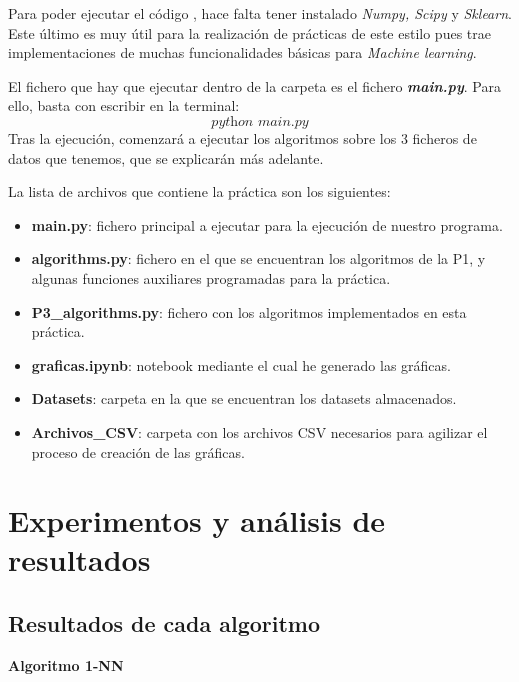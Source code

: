 \documentclass[10pt, a4paper]{article}
\theoremstyle{theorem-style}
\theoremstyle{theorem-style}
\theoremstyle{theorem2-style}
\theoremstyle{definition-style}
\theoremstyle{remark-style}
\theoremstyle{example-style}
\theoremstyle{definition-style}
\theoremstyle{remark-style}
\theoremstyle{remark-style}
\begin{document}
Para poder ejecutar el código , hace falta tener instalado \emph{Numpy, Scipy} y \emph{Sklearn}. Este último es muy útil para la realización de prácticas de este estilo pues trae implementaciones de muchas funcionalidades básicas para \emph{Machine learning}.

El fichero que hay que ejecutar dentro de la carpeta es el fichero \emph{\textbf{main.py}}. Para ello, basta con escribir en la terminal:
\[
\textit{python main.py}
\]
Tras la ejecución, comenzará a ejecutar los algoritmos sobre los 3 ficheros de datos que tenemos, que se explicarán más adelante.

La lista de archivos que contiene la práctica son los siguientes:
\begin{itemize}
	\item \textbf{main.py}: fichero principal a ejecutar para la ejecución de nuestro programa.	
	\item \textbf{algorithms.py}: fichero en el que se encuentran los algoritmos de la P1, y algunas funciones auxiliares programadas para la práctica.
\item \textbf{P3\_algorithms.py}: fichero con los algoritmos implementados en esta práctica. 
	\item \textbf{graficas.ipynb}: notebook mediante el cual he generado las gráficas.  
	\item \textbf{Datasets}: carpeta en la que se encuentran los datasets almacenados.
	\item \textbf{Archivos\_CSV}: carpeta con los archivos CSV necesarios para agilizar el proceso de creación de las gráficas.
	
\end{itemize}
\newpage
\section{Experimentos y análisis de resultados}

\subsection{Resultados de cada algoritmo}

\textbf{Algoritmo 1-NN}
\end{document}
